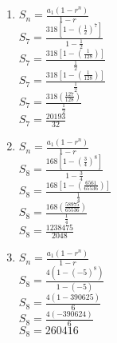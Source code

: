 \begin{enumerate}[label = \Alph*. ]
\begin{enumerate}[label = \arabic*. ]
\item %
$ S_{n} = \displaystyle\frac{a_1(1-r^n)}{1-r}$\\
$ S_{7} = \displaystyle\frac{318\left[ 1-\left(\frac{1}{2} \right) ^7\right] }{1-\frac{1}{2}}$\\
$ S_{7} = \displaystyle\frac{318\left[ 1-\left(\frac{1}{128} \right)\right] }{\frac{1}{2}}$\\
$ S_{7} = \displaystyle\frac{318\left[ 1-\left(\frac{1}{128} \right)\right] }{\frac{1}{2}}$\\
$ S_{7} = \displaystyle\frac{318\left(\frac{127}{128} \right) }{\frac{1}{2}}$\\
$ S_{7} =\displaystyle \frac{20193}{32} $

\item %
$ S_{n} = \displaystyle\frac{a_1(1-r^n)}{1-r}$\\
$ S_{8} = \displaystyle\frac{168\left[1-\left(\frac{3}{4} \right) ^8\right]}{1-\frac{3}{4}}$\\

$ S_{8} = \displaystyle\frac{168\left[1-\left(\frac{6561}{65536} \right)\right]}{\frac{1}{4}}$\\
$ S_{8} = \displaystyle\frac{168\left(\frac{58975}{65536} \right)}{\frac{1}{4}}$\\

$ S_{8} = \displaystyle\frac{1238475}{2048}$

\item %
$ S_{n} = \displaystyle\frac{a_1(1-r^n)}{1-r}$\\
$ S_{8} = \displaystyle\frac{4(1-(-5)^8)}{1-(-5)}$\\
$ S_{8} = \displaystyle\frac{4(1-390625)}{6}$\\
$ S_{8} = \displaystyle\frac{4(-390624)}{6}$\\
$ S_{8} =260416$


%
\end{enumerate}
\end{enumerate}